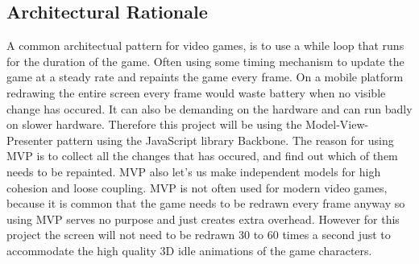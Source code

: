 \subsection{Architectural Rationale}

A common architectual pattern for video games, is to use a while loop that runs for the duration 
of the game. Often using some timing mechanism to update the game at a steady rate and repaints 
the game every frame. On a mobile platform redrawing the entire screen every frame would waste 
battery when no visible change has occured. It can also be demanding on the hardware and can run 
badly on slower hardware. Therefore this project will be using the Model-View-Presenter pattern 
using the JavaScript library Backbone. The reason for using MVP is to collect all the changes 
that has occured, and find out which of them needs to be repainted. MVP also let's us make 
independent models for high cohesion and loose coupling. MVP is not often used for modern video 
games, because it is common that the game needs to be redrawn every frame anyway so using MVP 
serves no purpose and just creates extra overhead. However for this project the screen will not 
need to be redrawn 30 to 60 times a second just to accommodate the high quality 3D idle animations 
of the game characters.
